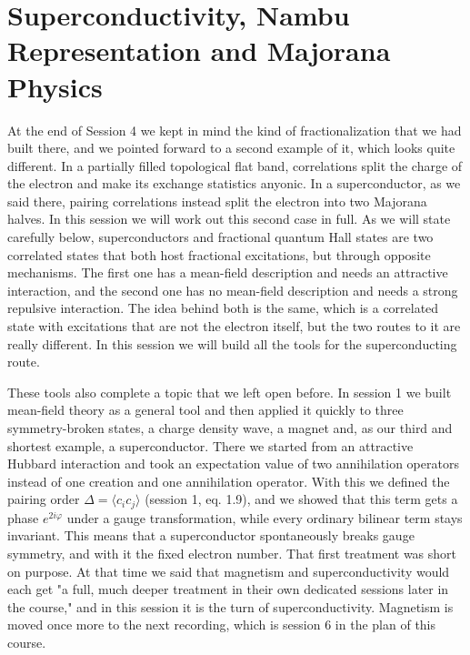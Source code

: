 \chapter{Superconductivity, Nambu Representation and Majorana Physics}

At the end of Session 4 we kept in mind the kind of fractionalization that we had built there, and
we pointed forward to a second example of it, which looks quite different. In a partially filled
topological flat band, correlations split the charge of the electron and make its exchange
statistics anyonic. In a superconductor, as we said there, pairing correlations instead split the
electron into two Majorana halves. In this session we will work out this second case in full. As
we will state carefully below, superconductors and fractional quantum Hall states are two
correlated states that both host fractional excitations, but through opposite mechanisms. The first
one has a mean-field description and needs an attractive interaction, and the second one has no
mean-field description and needs a strong repulsive interaction. The idea behind both is the same,
which is a correlated state with excitations that are not the electron itself, but the two routes
to it are really different. In this session we will build all the tools for the superconducting
route.

These tools also complete a topic that we left open before. In session 1 we built mean-field theory
as a general tool and then applied it quickly to three symmetry-broken states, a charge density
wave, a magnet and, as our third and shortest example, a superconductor. There we started from an
attractive Hubbard interaction and took an expectation value of two annihilation operators instead
of one creation and one annihilation operator. With this we defined the pairing order $\Delta =
\langle c_i c_j\rangle$ (session 1, eq. 1.9), and we showed that this term gets a phase
$e^{2i\varphi}$ under a gauge transformation, while every ordinary bilinear term stays invariant.
This means that a superconductor spontaneously breaks gauge symmetry, and with it the fixed electron
number. That first treatment was short on purpose. At that time we said that magnetism and
superconductivity would each get "a full, much deeper treatment in their own dedicated sessions
later in the course," and in this session it is the turn of superconductivity. Magnetism is moved
once more to the next recording, which is session 6 in the plan of this course.

